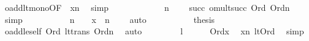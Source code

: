\begin{isabellebody}
\ oadd{\isacharunderscore}{\kern0pt}lt{\isacharunderscore}{\kern0pt}mono{\isacharbrackleft}{\kern0pt}OF\ {\isacharunderscore}{\kern0pt}\ {\isacartoucheopen}x{\isacharless}{\kern0pt}n{\isacartoucheclose}{\isacharbrackright}{\kern0pt}\ \isamarkupfalse%
\ simp\isanewline
\ \ \ \ \isamarkupfalse%
\isanewline
\ \ \ \ \isamarkupfalse%
\ {\isachardoublequoteopen}{\isachardot}{\kern0pt}{\isachardot}{\kern0pt}{\isachardot}{\kern0pt}\ {\isacharequal}{\kern0pt}\ n\ {\isacharasterisk}{\kern0pt}{\isacharasterisk}{\kern0pt}\ {\isasymbeta}{\isachardoublequoteclose}\ \isamarkupfalse%
\ {\isacartoucheopen}{\isasymbeta}{\isacharequal}{\kern0pt}succ{\isacharparenleft}{\kern0pt}{\isacharunderscore}{\kern0pt}{\isacharparenright}{\kern0pt}{\isacartoucheclose}\ omult{\isacharunderscore}{\kern0pt}succ\ {\isacartoucheopen}Ord{\isacharparenleft}{\kern0pt}{\isasymbeta}{\isacharparenright}{\kern0pt}{\isacartoucheclose}\ {\isacartoucheopen}Ord{\isacharparenleft}{\kern0pt}n{\isacharparenright}{\kern0pt}{\isacartoucheclose}\ \isamarkupfalse%
\ simp\isanewline
\ \ \ \ \isamarkupfalse%
\isanewline
\ \ \ \ \isamarkupfalse%
\ {\isachardoublequoteopen}n\ {\isacharasterisk}{\kern0pt}{\isacharasterisk}{\kern0pt}\ {\isasymalpha}\ {\isacharplus}{\kern0pt}{\isacharplus}{\kern0pt}\ x\ {\isacharless}{\kern0pt}\ n\ {\isacharasterisk}{\kern0pt}{\isacharasterisk}{\kern0pt}\ {\isasymbeta}{\isachardoublequoteclose}\ \isamarkupfalse%
\ auto\isanewline
\ \ \ \ \isamarkupfalse%
\isanewline
\ \ \ \ \isamarkupfalse%
\ {\isacharquery}{\kern0pt}thesis\ \isamarkupfalse%
\ oadd{\isacharunderscore}{\kern0pt}le{\isacharunderscore}{\kern0pt}self\ {\isacartoucheopen}Ord{\isacharparenleft}{\kern0pt}{\isasymbeta}{\isacharparenright}{\kern0pt}{\isacartoucheclose}\ lt{\isacharunderscore}{\kern0pt}trans{}\ {\isacartoucheopen}Ord{\isacharparenleft}{\kern0pt}n{\isacharparenright}{\kern0pt}{\isacartoucheclose}\ \isamarkupfalse%
\ auto\isanewline
\ \ \isamarkupfalse%
\isanewline
\ \ \ \ \isamarkupfalse%
\ l\isanewline
\ \ \ \ \isamarkupfalse%
\ {\isachardoublequoteopen}Ord{\isacharparenleft}{\kern0pt}x{\isacharparenright}{\kern0pt}{\isachardoublequoteclose}\ \isamarkupfalse%
\ {\isacartoucheopen}x{\isacharless}{\kern0pt}n{\isacartoucheclose}\ lt{\isacharunderscore}{\kern0pt}Ord\ \isamarkupfalse%
\ simp\isanewline
\ \ \ \ \isamarkupfalse%

\end{isabellebody}
